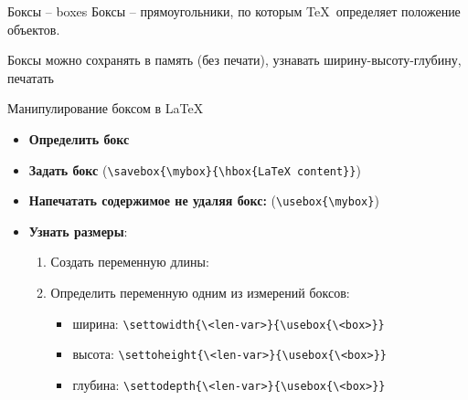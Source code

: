 \begin{frame}{Боксы -- boxes}\relax
    Боксы -- прямоугольники, по которым \TeX\ определяет положение объектов.
    
    Боксы можно сохранять в память (без печати), узнавать ширину-высоту-глубину, печатать
         
\end{frame}


\begin{frame}[fragile]{Манипулирование боксом в \LaTeX\lW\magicPage}\relax
    \begin{itemize}
        \item \textbf{Определить бокс} 
        \item \textbf{Задать бокс} \ccol{\savebox} (\lstinline|\savebox{\mybox}{\hbox{LaTeX content}}|)
        \item \textbf{Напечатать содержимое не удаляя бокс:} \ccol{\usebox} (\lstinline|\usebox{\mybox}|)
        \item \textbf{Узнать размеры}: 
        \begin{enumerate}
            \item Создать переменную длины: \ccol\newlength
            \item Определить переменную одним из измерений боксов:
            \begin{itemize}
                \item ширина: \verb|\settowidth{\<len-var>}{\usebox{\<box>}}|
                \item высота: \verb|\settoheight{\<len-var>}{\usebox{\<box>}}|
                \item глубина: \verb|\settodepth{\<len-var>}{\usebox{\<box>}}|
            \end{itemize}
        \end{enumerate}
    \end{itemize}

\end{frame}


